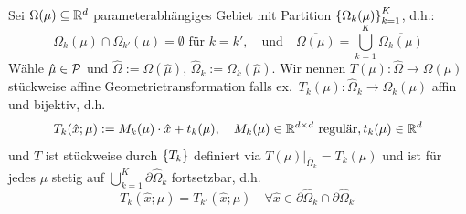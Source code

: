 \begin{defn}
	Sei $\Omega(\mu) \subseteq \mathbb{R}^d$ parameterabhängiges Gebiet mit Partition $\left\{\Omega_k(\mu)\right\}_{k=1}^K$, d.h.:
	\[
		\Omega_k(\mu) \cap \Omega_{k'}(\mu) = \emptyset \text{ für } k = k', \quad \text{und} \quad \overline{\Omega(\mu)} = \bigcup_{k=1}^{K} \overline{\Omega_k(\mu)}
	\]
	Wähle $\hat\mu \in \mathcal{P}$ und $\hat \Omega := \Omega(\hat\mu)$, $\hat\Omega_k := \Omega_k(\hat\mu)$.
	Wir nennen $T(\mu) : \hat\Omega \to \Omega(\mu)$ stückweise affine Geometrietransformation falls ex.\ $T_k(\mu): \hat\Omega_k \to \Omega_k(\mu)$ affin und bijektiv, d.h.
	\[
		T_k(\hat x;\mu) := M_k(\mu) \cdot \hat x + t_k(\mu), \quad M_k(\mu) \in \mathbb{R}^{d \times d} \text{ regulär}, t_k(\mu) \in \mathbb{R}^d
	\]
	und $T$ ist stückweise durch $\left\{T_k\right\}$ definiert via $T(\mu)|_{\hat\Omega_k}=T_k(\mu)$ und ist für jedes $\mu$ stetig auf $\bigcup_{k=1}^K \partial\hat\Omega_k$ fortsetzbar, d.h.
	\[
		T_k(\hat x;\mu) = T_{k'}(\hat x;\mu) \quad \forall \hat x \in \partial\hat\Omega_k \cap \partial\hat\Omega_{k'}
	\]
\end{defn}


